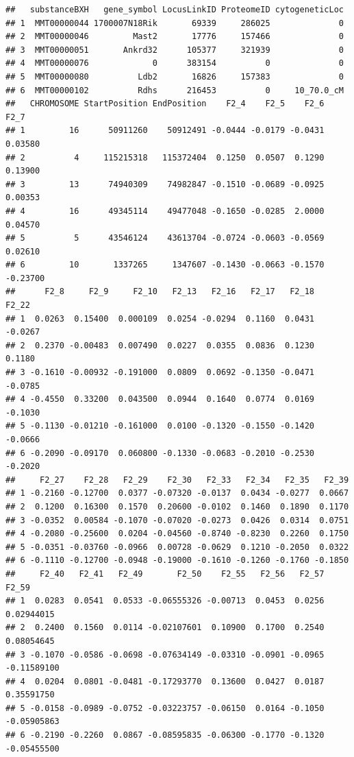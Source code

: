 \documentclass[]{article}
\begin{document}
\begin{verbatim}
##   substanceBXH   gene_symbol LocusLinkID ProteomeID cytogeneticLoc
## 1  MMT00000044 1700007N18Rik       69339     286025              0
## 2  MMT00000046         Mast2       17776     157466              0
## 3  MMT00000051       Ankrd32      105377     321939              0
## 4  MMT00000076             0      383154          0              0
## 5  MMT00000080          Ldb2       16826     157383              0
## 6  MMT00000102          Rdhs      216453          0     10_70.0_cM
##   CHROMOSOME StartPosition EndPosition    F2_4    F2_5    F2_6     F2_7
## 1         16      50911260    50912491 -0.0444 -0.0179 -0.0431  0.03580
## 2          4     115215318   115372404  0.1250  0.0507  0.1290  0.13900
## 3         13      74940309    74982847 -0.1510 -0.0689 -0.0925  0.00353
## 4         16      49345114    49477048 -0.1650 -0.0285  2.0000  0.04570
## 5          5      43546124    43613704 -0.0724 -0.0603 -0.0569  0.02610
## 6         10       1337265     1347607 -0.1430 -0.0663 -0.1570 -0.23700
##      F2_8     F2_9     F2_10   F2_13   F2_16   F2_17   F2_18   F2_22
## 1  0.0263  0.15400  0.000109  0.0254 -0.0294  0.1160  0.0431 -0.0267
## 2  0.2370 -0.00483  0.007490  0.0227  0.0355  0.0836  0.1230  0.1180
## 3 -0.1610 -0.00932 -0.191000  0.0809  0.0692 -0.1350 -0.0471 -0.0785
## 4 -0.4550  0.33200  0.043500  0.0944  0.1640  0.0774  0.0169 -0.1030
## 5 -0.1130 -0.01210 -0.161000  0.0100 -0.1320 -0.1550 -0.1420 -0.0666
## 6 -0.2090 -0.09170  0.060800 -0.1330 -0.0683 -0.2010 -0.2530 -0.2020
##     F2_27    F2_28   F2_29    F2_30   F2_33   F2_34   F2_35   F2_39
## 1 -0.2160 -0.12700  0.0377 -0.07320 -0.0137  0.0434 -0.0277  0.0667
## 2  0.1200  0.16300  0.1570  0.20600 -0.0102  0.1460  0.1890  0.1170
## 3 -0.0352  0.00584 -0.1070 -0.07020 -0.0273  0.0426  0.0314  0.0751
## 4 -0.2080 -0.25600  0.0204 -0.04560 -0.8740 -0.8230  0.2260  0.1750
## 5 -0.0351 -0.03760 -0.0966  0.00728 -0.0629  0.1210 -0.2050  0.0322
## 6 -0.1110 -0.12700 -0.0948 -0.19000 -0.1610 -0.1260 -0.1760 -0.1850
##     F2_40   F2_41   F2_49       F2_50    F2_55   F2_56   F2_57       F2_59
## 1  0.0283  0.0541  0.0533 -0.06555326 -0.00713  0.0453  0.0256  0.02944015
## 2  0.2400  0.1560  0.0114 -0.02107601  0.10900  0.1700  0.2540  0.08054645
## 3 -0.1070 -0.0586 -0.0698 -0.07634149 -0.03310 -0.0901 -0.0965 -0.11589100
## 4  0.0204  0.0801 -0.0481 -0.17293770  0.13600  0.0427  0.0187  0.35591750
## 5 -0.0158 -0.0989 -0.0752 -0.03223757 -0.06150  0.0164 -0.1050 -0.05905863
## 6 -0.2190 -0.2260  0.0867 -0.08595835 -0.06300 -0.1770 -0.1320 -0.05455500

\end{verbatim}
\end{document}
